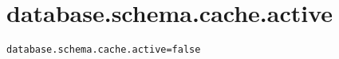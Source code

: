 \section{database.schema.cache.active}
\label{configuration:DatabaseSchemaCacheActive}
\ClearAPI
\TODO
{}
\begin{lstlisting}[style=Props,caption={Usage example for \textit{database.schema.cache.active}}]
database.schema.cache.active=false
\end{lstlisting}